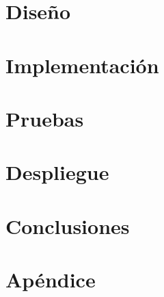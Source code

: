 \documentclass[a4paper, 11pt, oneside]{memoir}
\begin{document}
\chapter{Diseño} \label{ch:diseño}

\cleardoublepage

\chapter{Implementación} \label{ch:implementacion}

\cleardoublepage

\chapter{Pruebas} \label{ch:pruebas}

\cleardoublepage

\chapter{Despliegue} \label{ch:despliegue}

\cleardoublepage

\chapter{Conclusiones} \label{ch:conclusiones}

\cleardoublepage


\backmatter
\appendix

\chapter{Apéndice} \label{ch:apendice}





\end{document}
